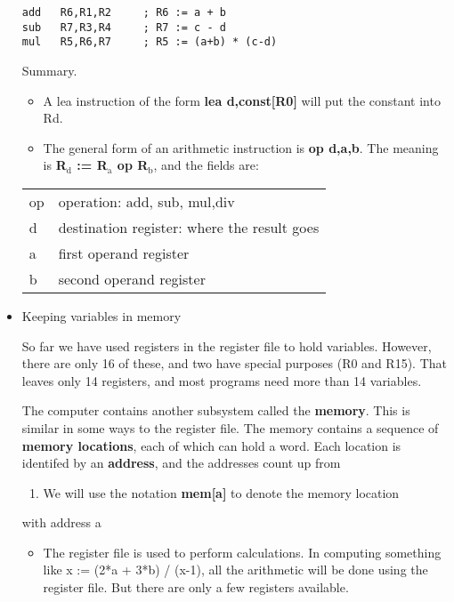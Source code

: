 \documentclass[11pt]{article}
\begin{document}
\begin{itemize}
\begin{verbatim}
add   R6,R1,R2     ; R6 := a + b
sub   R7,R3,R4     ; R7 := c - d
mul   R5,R6,R7     ; R5 := (a+b) * (c-d)
\end{verbatim}

Summary.

\begin{itemize}
\item A lea instruction of the form \textbf{lea d,const[R0]} will put the
constant into Rd.
\item The general form of an arithmetic instruction is \textbf{op d,a,b}.  
The meaning is \textbf{R\(_{\text{d}}\) := R\(_{\text{a}}\)  op  R\(_{\text{b}}\)}, and the fields are:
\end{itemize}

\begin{center}
\begin{tabular}{ll}
op & operation: add, sub, mul,div\\
d & destination register: where the result goes\\
a & first operand register\\
b & second operand register\\
\end{tabular}
\end{center}

\item Keeping variables in memory
\label{sec:org4a8b8bd}

So far we have used registers in the register file to hold variables.
However, there are only 16 of these, and two have special purposes (R0
and R15).  That leaves only 14 registers, and most programs need more
than 14 variables.

The computer contains another subsystem called the \textbf{memory}.  This is
similar in some ways to the register file.  The memory contains a
sequence of \textbf{memory locations}, each of which can hold a word.  Each
location is identifed by an \textbf{address}, and the addresses count up from
\begin{enumerate}
\item We will use the notation \textbf{mem[a]} to denote the memory location
\end{enumerate}
with address a

\begin{itemize}
\item The register file is used to perform calculations.  In computing
something like x := (2*a + 3*b) / (x-1), all the arithmetic will be
done using the register file.  But there are only a few registers
available.


\end{itemize}
\end{itemize}
\end{document}
